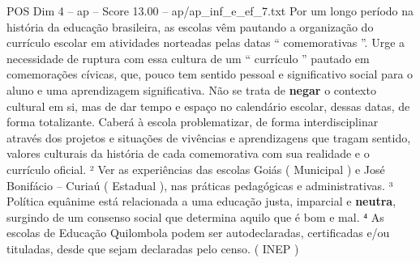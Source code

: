 \begin{textsample}{POS Dim 4 – ap – Score 13.00 – ap/ap\_inf\_e\_ef\_7.txt}
Por um longo período na história da educação brasileira, as escolas vêm pautando a organização do currículo escolar em atividades norteadas pelas datas “ comemorativas ”.
Urge a necessidade de ruptura com essa cultura de um “ currículo ” pautado em comemorações cívicas, que, pouco tem sentido pessoal e significativo social para o aluno e uma aprendizagem significativa.
Não se trata de \textbf{negar} o contexto cultural em si, mas de dar tempo e espaço no calendário escolar, dessas datas, de forma totalizante.
Caberá à escola problematizar, de forma interdisciplinar através dos projetos e situações de vivências e aprendizagens que tragam sentido, valores culturais da história de cada comemorativa com sua realidade e o currículo oficial. ² Ver as experiências das escolas Goiás ( Municipal ) e José Bonifácio – Curiaú ( Estadual ), nas práticas pedagógicas e administrativas. ³ Política equânime está relacionada a uma educação justa, imparcial e \textbf{neutra}, surgindo de um consenso social que determina aquilo que é bom e mal. ⁴ As escolas de Educação Quilombola podem ser autodeclaradas, certificadas e/ou tituladas, desde que sejam declaradas pelo censo. ( INEP )

\end{textsample}

